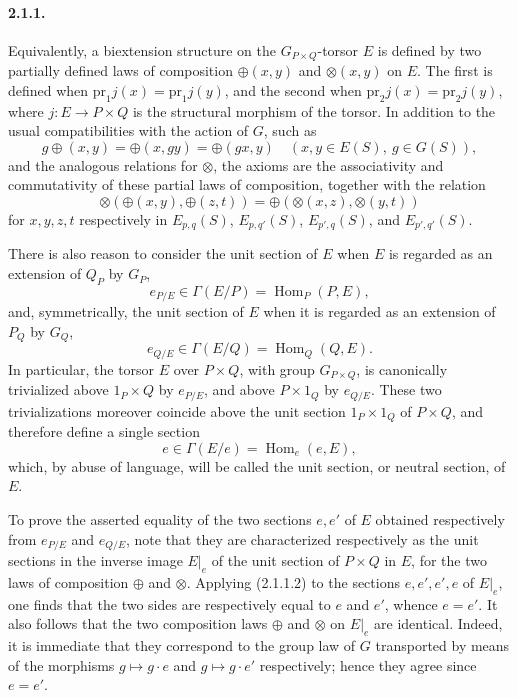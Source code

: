\documentclass[11pt]{article}
\theoremstyle{plain}
\theoremstyle{definition}
\theoremstyle{remark}
\DeclareMathOperator{\Hom}{Hom}
\begin{document}
\paragraph{2.1.1.} Equivalently, a biextension structure on the $G_{P\times Q}$-torsor $E$ is defined by two partially defined laws of composition $\oplus(x,y)$ and $\otimes(x,y)$ on $E$. The first is defined when $\mathrm{pr}_1 j(x)=\mathrm{pr}_1 j(y)$, and the second when $\mathrm{pr}_2 j(x)=\mathrm{pr}_2 j(y)$, where $j:E\to P\times Q$ is the structural morphism of the torsor. In addition to the usual compatibilities with the action of $G$, such as
\begin{equation}
g\oplus(x,y)=\oplus(x,gy)=\oplus(gx,y)
\quad (x,y\in E(S),\ g\in G(S)),
\tag{2.1.1.1}
\end{equation}
and the analogous relations for $\otimes$, the axioms are the associativity and commutativity of these partial laws of composition, together with the relation
\begin{equation}
\otimes(\oplus(x,y),\oplus(z,t))=
\oplus(\otimes(x,z),\otimes(y,t))
\tag{2.1.1.2}
\end{equation}
for $x,y,z,t$ respectively in $E_{p,q}(S)$, $E_{p,q'}(S)$, $E_{p',q}(S)$, and $E_{p',q'}(S)$.

There is also reason to consider the unit section of $E$ when $E$ is regarded as an extension of $Q_P$ by $G_P$,
\begin{equation}
e_{P/E}\in \Gamma(E/P)=\Hom_P(P,E),
\tag{2.2.1}
\end{equation}
and, symmetrically, the unit section of $E$ when it is regarded as an extension of $P_Q$ by $G_Q$,
\begin{equation}
e_{Q/E}\in \Gamma(E/Q)=\Hom_Q(Q,E).
\tag{2.2.2}
\end{equation}
In particular, the torsor $E$ over $P\times Q$, with group $G_{P\times Q}$, is canonically trivialized above $1_P\times Q$ by $e_{P/E}$, and above $P\times 1_Q$ by $e_{Q/E}$. These two trivializations moreover coincide above the unit section $1_P\times 1_Q$ of $P\times Q$, and therefore define a single section
\begin{equation}
e\in \Gamma(E/e)=\Hom_e(e,E),
\tag{2.2.3}
\end{equation}
which, by abuse of language, will be called the unit section, or neutral section, of $E$.

To prove the asserted equality of the two sections $e,e'$ of $E$ obtained respectively from $e_{P/E}$ and $e_{Q/E}$, note that they are characterized respectively as the unit sections in the inverse image $E|_e$ of the unit section of $P\times Q$ in $E$, for the two laws of composition $\oplus$ and $\otimes$. Applying (2.1.1.2) to the sections $e,e',e',e$ of $E|_e$, one finds that the two sides are respectively equal to $e$ and $e'$, whence $e=e'$. It also follows that the two composition laws $\oplus$ and $\otimes$ on $E|_e$ are identical. Indeed, it is immediate that they correspond to the group law of $G$ transported by means of the morphisms $g\mapsto g\cdot e$ and $g\mapsto g\cdot e'$ respectively; hence they agree since $e=e'$.
\end{document}
